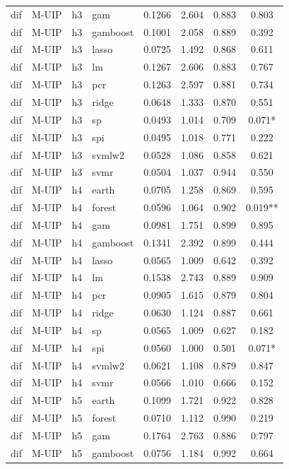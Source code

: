 \begin{ThreePartTable}
\begin{longtable}[t]{llclcccc}
dif & M-UIP & h3 & gam & 0.1266 & 2.604 & 0.883 & 0.803\\
dif & M-UIP & h3 & gamboost & 0.1001 & 2.058 & 0.889 & 0.392\\
dif & M-UIP & h3 & lasso & 0.0725 & 1.492 & 0.868 & 0.611\\
dif & M-UIP & h3 & lm & 0.1267 & 2.606 & 0.883 & 0.767\\
dif & M-UIP & h3 & pcr & 0.1263 & 2.597 & 0.881 & 0.734\\
dif & M-UIP & h3 & ridge & 0.0648 & 1.333 & 0.870 & 0.551\\
dif & M-UIP & h3 & sp & 0.0493 & 1.014 & 0.709 & 0.071*\\
dif & M-UIP & h3 & spi & 0.0495 & 1.018 & 0.771 & 0.222\\
dif & M-UIP & h3 & svmlw2 & 0.0528 & 1.086 & 0.858 & 0.621\\
dif & M-UIP & h3 & svmr & 0.0504 & 1.037 & 0.944 & 0.550\\
\addlinespace
dif & M-UIP & h4 & earth & 0.0705 & 1.258 & 0.869 & 0.595\\
dif & M-UIP & h4 & forest & 0.0596 & 1.064 & 0.902 & 0.019**\\
dif & M-UIP & h4 & gam & 0.0981 & 1.751 & 0.899 & 0.895\\
dif & M-UIP & h4 & gamboost & 0.1341 & 2.392 & 0.899 & 0.444\\
dif & M-UIP & h4 & lasso & 0.0565 & 1.009 & 0.642 & 0.392\\
dif & M-UIP & h4 & lm & 0.1538 & 2.743 & 0.889 & 0.909\\
dif & M-UIP & h4 & pcr & 0.0905 & 1.615 & 0.879 & 0.804\\
dif & M-UIP & h4 & ridge & 0.0630 & 1.124 & 0.887 & 0.661\\
dif & M-UIP & h4 & sp & 0.0565 & 1.009 & 0.627 & 0.182\\
dif & M-UIP & h4 & spi & 0.0560 & 1.000 & 0.501 & 0.071*\\
dif & M-UIP & h4 & svmlw2 & 0.0621 & 1.108 & 0.879 & 0.847\\
dif & M-UIP & h4 & svmr & 0.0566 & 1.010 & 0.666 & 0.152\\
\addlinespace
dif & M-UIP & h5 & earth & 0.1099 & 1.721 & 0.922 & 0.828\\
dif & M-UIP & h5 & forest & 0.0710 & 1.112 & 0.990 & 0.219\\
dif & M-UIP & h5 & gam & 0.1764 & 2.763 & 0.886 & 0.797\\
dif & M-UIP & h5 & gamboost & 0.0756 & 1.184 & 0.992 & 0.664\\

\end{longtable}
\end{ThreePartTable}
